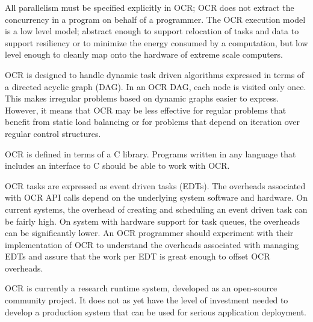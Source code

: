 All parallelism must be specified explicitly in OCR; OCR does not
extract the concurrency in a program on behalf of a programmer. The
OCR execution model is a low level model; abstract enough to support
relocation of tasks and data to support resiliency or to minimize the
energy consumed by a computation, but low level enough to cleanly map
onto the hardware of extreme scale computers.

OCR is designed to handle dynamic task driven algorithms expressed in
terms of a directed acyclic graph (DAG). In an OCR DAG, each node is
visited only once. This makes irregular problems based on dynamic
graphs easier to express. However, it means that OCR may be less
effective for regular problems that benefit from static load balancing
or for problems that depend on iteration over regular control
structures.
%

OCR is defined in terms of a C library. Programs written in any
language that includes an interface to C should be able to work with
OCR.

OCR tasks are expressed as event driven tasks (EDTs).
The overheads associated with OCR API calls depend on the underlying
system software and hardware. On current systems, the overhead of
creating and scheduling an event driven task can be fairly high.
On system with hardware support for task queues, the
overheads can be significantly lower. An OCR programmer should experiment with their
implementation of OCR to understand the overheads associated with managing EDTs and
assure that the work per EDT is great enough to offset OCR overheads.

OCR is currently a research runtime system, developed as an
open-source community project. It does not as yet have the level of
investment needed to develop a production system that can be used for
serious application deployment.
